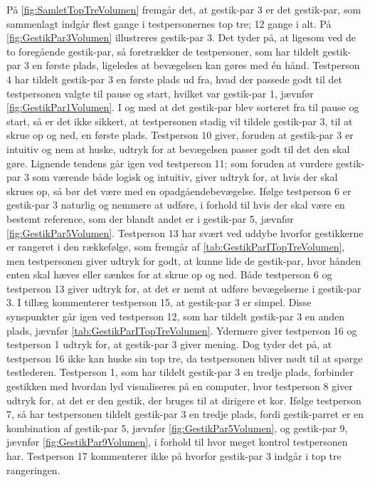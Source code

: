 På \autoref{fig:SamletTopTreVolumen} fremgår det, at gestik-par 3 er det gestik-par, som sammenlagt indgår flest gange i testpersonernes top tre; 12 gange i alt. På \autoref{fig:GestikPar3Volumen} illustreres gestik-par 3. Det tyder på, at ligesom ved de to foregående gestik-par, så foretrækker de testpersoner, som har tildelt gestik-par 3 en første plads, ligeledes at bevægelsen kan gøres med én hånd. Testperson 4 har tildelt gestik-par 3 en første plads ud fra, hvad der passede godt til det testpersonen valgte til pause og start, hvilket var gestik-par 1, jævnfør \autoref{fig:GestikPar1Volumen}. I og med at det gestik-par blev sorteret fra til pause og start, så er det ikke sikkert, at testpersonen stadig vil tildele gestik-par 3, til at skrue op og ned, en første plads. Testperson 10 giver, foruden at gestik-par 3 er intuitiv og nem at huske, udtryk for at bevægelsen passer godt til det den skal gøre. Lignende tendens går igen ved testperson 11; som foruden at vurdere gestik-par 3 som værende både logisk og intuitiv, giver udtryk for, at hvis der skal skrues op, så bør det være med en opadgåendebevægelse. Ifølge testperson 6 er gestik-par 3 naturlig og nemmere at udføre, i forhold til hvis der skal være en bestemt reference, som der blandt andet er i gestik-par 5, jævnfør \autoref{fig:GestikPar5Volumen}. Testperson 13 har svært ved uddybe hvorfor gestikkerne er rangeret i den rækkefølge, som fremgår af \autoref{tab:GestikParITopTreVolumen}, men testpersonen giver udtryk for godt, at kunne lide de gestik-par, hvor hånden enten skal hæves eller sænkes for at skrue op og ned. Både testperson 6 og testperson 13 giver udtryk for, at det er nemt at udføre bevægelserne i gestik-par 3. I tillæg kommenterer testperson 15, at gestik-par 3 er simpel. Disse synspunkter går igen ved testperson 12, som har tildelt gestik-par 3 en anden plads, jævnfør \autoref{tab:GestikParITopTreVolumen}. Ydermere giver testperson 16 og testperson 1 udtryk for, at gestik-par 3 giver mening. Dog tyder det på, at testperson 16 ikke kan huske sin top tre, da testpersonen bliver nødt til at spørge testlederen. Testperson 1, som har tildelt gestik-par 3 en tredje plads, forbinder gestikken med hvordan lyd visualiseres på en computer, hvor testperson 8 giver udtryk for, at det er den gestik, der bruges til at dirigere et kor. Ifølge testperson 7, så har testpersonen tildelt gestik-par 3 en tredje plads, fordi gestik-parret er en kombination af gestik-par 5, jævnfør \autoref{fig:GestikPar5Volumen}, og gestik-par 9, jævnfør \autoref{fig:GestikPar9Volumen}, i forhold til hvor meget kontrol testpersonen har. Testperson 17 kommenterer ikke på hvorfor gestik-par 3 indgår i top tre rangeringen.

